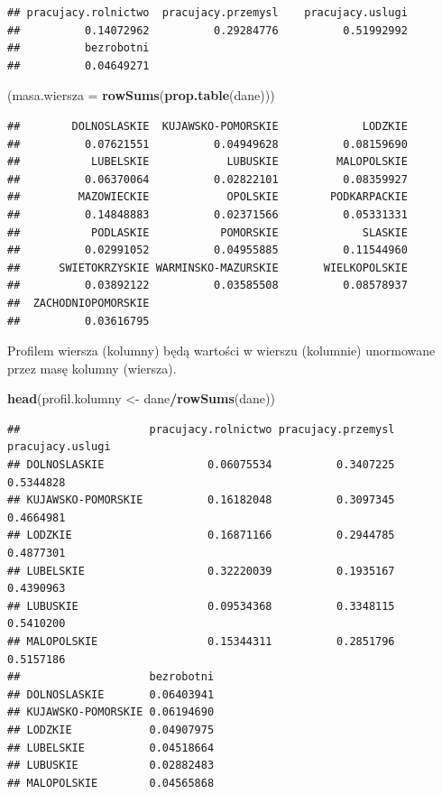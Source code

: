 \documentclass[polish,]{book}
\newenvironment{Shaded}{\begin{snugshade}}{\end{snugshade}}
\newcommand{\DataTypeTok}[1]{\textcolor[rgb]{0.13,0.29,0.53}{#1}}
\newcommand{\KeywordTok}[1]{\textcolor[rgb]{0.13,0.29,0.53}{\textbf{#1}}}
\newcommand{\NormalTok}[1]{#1}
\newcommand{\OperatorTok}[1]{\textcolor[rgb]{0.81,0.36,0.00}{\textbf{#1}}}
\newcommand{\StringTok}[1]{\textcolor[rgb]{0.31,0.60,0.02}{#1}}
\begin{document}
\begin{verbatim}
## pracujacy.rolnictwo  pracujacy.przemysl    pracujacy.uslugi 
##          0.14072962          0.29284776          0.51992992 
##          bezrobotni 
##          0.04649271
\end{verbatim}

\begin{Shaded}
\begin{Highlighting}[]
\NormalTok{(}\DataTypeTok{masa.wiersza =} \KeywordTok{rowSums}\NormalTok{(}\KeywordTok{prop.table}\NormalTok{(dane)))}
\end{Highlighting}
\end{Shaded}

\begin{verbatim}
##        DOLNOSLASKIE  KUJAWSKO-POMORSKIE             LODZKIE 
##          0.07621551          0.04949628          0.08159690 
##           LUBELSKIE            LUBUSKIE         MALOPOLSKIE 
##          0.06370064          0.02822101          0.08359927 
##         MAZOWIECKIE            OPOLSKIE        PODKARPACKIE 
##          0.14848883          0.02371566          0.05331331 
##           PODLASKIE           POMORSKIE             SLASKIE 
##          0.02991052          0.04955885          0.11544960 
##      SWIETOKRZYSKIE WARMINSKO-MAZURSKIE       WIELKOPOLSKIE 
##          0.03892122          0.03585508          0.08578937 
##  ZACHODNIOPOMORSKIE 
##          0.03616795
\end{verbatim}

Profilem wiersza (kolumny) będą wartości w wierszu (kolumnie) unormowane
przez masę kolumny (wiersza).

\begin{Shaded}
\begin{Highlighting}[]
\KeywordTok{head}\NormalTok{(profil.kolumny <-}\StringTok{ }\NormalTok{dane}\OperatorTok{/}\KeywordTok{rowSums}\NormalTok{(dane))}
\end{Highlighting}
\end{Shaded}

\begin{verbatim}
##                    pracujacy.rolnictwo pracujacy.przemysl pracujacy.uslugi
## DOLNOSLASKIE                0.06075534          0.3407225        0.5344828
## KUJAWSKO-POMORSKIE          0.16182048          0.3097345        0.4664981
## LODZKIE                     0.16871166          0.2944785        0.4877301
## LUBELSKIE                   0.32220039          0.1935167        0.4390963
## LUBUSKIE                    0.09534368          0.3348115        0.5410200
## MALOPOLSKIE                 0.15344311          0.2851796        0.5157186
##                    bezrobotni
## DOLNOSLASKIE       0.06403941
## KUJAWSKO-POMORSKIE 0.06194690
## LODZKIE            0.04907975
## LUBELSKIE          0.04518664
## LUBUSKIE           0.02882483
## MALOPOLSKIE        0.04565868
\end{verbatim}
\end{document}
